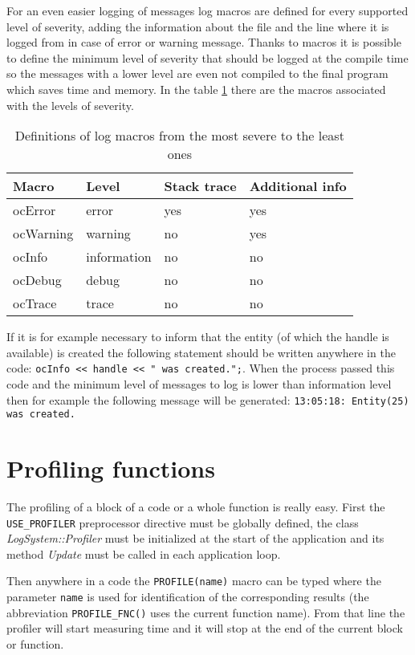 For an even easier logging of messages log macros are defined for every supported level of severity, adding the information about the file and the line where it is logged from in case of error or warning message. Thanks to macros it is possible to define the minimum level of severity that should be logged at the compile time so the messages with a lower level are even not compiled to the final program which saves time and memory. In the table \ref{tab:log-macros} there are the macros associated with the levels of severity.

\begin{table}[htbp]
	\centering
		\begin{tabular}{|l|l|l|l|}
			\hline
			Macro & Level & Stack trace & Additional info \\
			\hline
			ocError & error & yes & yes \\
			ocWarning & warning & no & yes \\
			ocInfo & information & no & no \\
			ocDebug & debug & no & no \\
			ocTrace & trace & no & no \\
			\hline
		\end{tabular}
	\caption{Definitions of log macros from the most severe to the least ones}
	\label{tab:log-macros}
\end{table}

If it is for example necessary to inform that the entity (of which the handle is available) is created the following statement should be written anywhere in the code: \verb/ocInfo << handle << " was created.";/. When the process passed this code and the minimum level of messages to log is lower than information level then for example the following message will be generated: \verb/13:05:18: Entity(25) was created./

\section{Profiling functions}

The profiling of a block of a code or a whole function is really easy. First the \verb/USE_PROFILER/ preprocessor directive must be globally defined, the class \emph{LogSystem::Profiler} must be initialized at the start of the application and its method \emph{Update} must be called in each application loop.

Then anywhere in a code the \verb/PROFILE(name)/ macro can be typed where the parameter \verb/name/ is used for identification of the corresponding results (the abbreviation \verb/PROFILE_FNC()/ uses the current function name). From that line the profiler will start measuring time and it will stop at the end of the current block or function.

